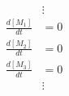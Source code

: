\documentclass[12pt]{article}
\begin{document}
\begin{align}
&\vdots\\
\frac{d[M_{1}]}{dt} &= 0\\
\frac{d[M_{2}]}{dt} &= 0\\
\frac{d[M_{3}]}{dt} &= 0\\
&\vdots\\
\end{align}


\normalsize
\cite{Kacser:1973fe}
\cite{Hansen:2009em}
\cite{Lu:2006cx}
\cite{Hanahan:2011gu}
\cite{Khan:2009ik}



\end{document}
